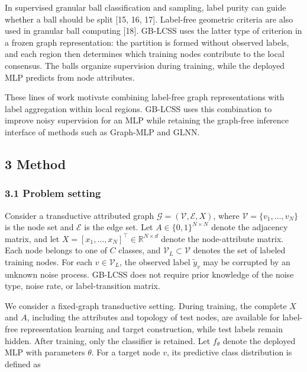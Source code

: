 In supervised granular ball classification and sampling, label purity can guide whether a ball should be split {[}15, 16, 17{]}. Label-free geometric criteria are also used in granular ball computing {[}18{]}. GB-LCSS uses the latter type of criterion in a frozen graph representation: the partition is formed without observed labels, and each region then determines which training nodes contribute to the local consensus. The balls organize supervision during training, while the deployed MLP predicts from node attributes.

These lines of work motivate combining label-free graph representations with label aggregation within local regions. GB-LCSS uses this combination to improve noisy supervision for an MLP while retaining the graph-free inference interface of methods such as Graph-MLP and GLNN.

\subsection{3 Method}\label{method}

\subsubsection{3.1 Problem setting}\label{problem-setting}

Consider a transductive attributed graph \(\mathcal{G} = \left( \mathcal{V},\mathcal{E},X \right)\), where \(\mathcal{V} = \{ v_{1},\ldots,v_{N}\}\) is the node set and \(\mathcal{E}\) is the edge set. Let \(A \in \{ 0,1\}^{N \times N}\) denote the adjacency matrix, and let \(X = \left\lbrack x_{1},\ldots,x_{N} \right\rbrack^{\top} \in \mathbb{R}^{N \times d}\) denote the node-attribute matrix. Each node belongs to one of \(C\) classes, and \(\mathcal{V}_{L} \subset \mathcal{V}\) denotes the set of labeled training nodes. For each \(v \in \mathcal{V}_{L}\), the observed label \({\widetilde{y}}_{v}\) may be corrupted by an unknown noise process. GB-LCSS does not require prior knowledge of the noise type, noise rate, or label-transition matrix.

We consider a fixed-graph transductive setting. During training, the complete \(X\) and \(A\), including the attributes and topology of test nodes, are available for label-free representation learning and target construction, while test labels remain hidden. After training, only the classifier is retained. Let \(f_{\theta}\) denote the deployed MLP with parameters \(\theta\). For a target node \(v\), its predictive class distribution is defined as

